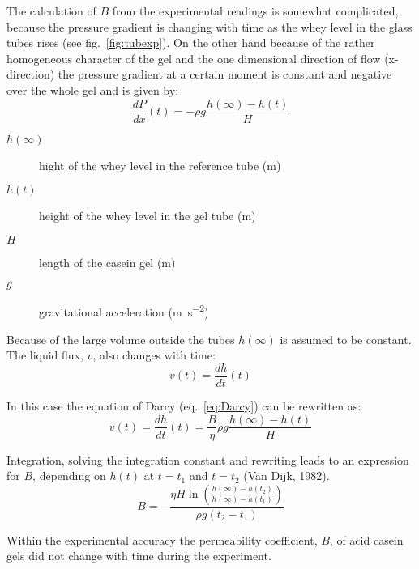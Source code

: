 \documentclass[12pt,a4paper]{article}
\begin{document}
The calculation of $B$ from the experimental readings is somewhat complicated, because the pressure gradient is changing with time as the whey level in the glass tubes rises (see fig.~\ref{fig:tubexp}). On the other hand because of the rather homogeneous character of the gel and the one dimensional direction of flow (x-direction) the pressure gradient at a certain moment is constant and negative over the whole gel and is given by:
\begin{equation}
\frac{dP}{dx}(t) = -\rho g\frac{h(\infty)-h(t)}{H}
\end{equation}
\begin{description}
\item[$h(\infty)$] hight of the whey level in the reference tube (\si{\metre})
\item[$h(t)$] height of the whey level in the gel tube (\si{\metre})
\item[$H$] length of the casein gel (\si{\metre})
\item[$g$] gravitational acceleration (\si{\metre\per\square\second})
\end{description}

Because of the large volume outside the tubes $h(\infty)$ is assumed to be constant. The liquid flux, $v$, also changes with time:
\begin{equation}
v(t) = \frac{dh}{dt}(t)
\end{equation}

In this case the equation of Darcy (eq.~\eqref{eq:Darcy}) can be rewritten as:
\begin{equation}
 v(t) = \frac{dh}{dt}(t) = \frac{B}{\eta}\rho g\frac{h(\infty)-h(t)}{H}
\end{equation}

Integration, solving the integration constant and rewriting leads to an expression for $B$, depending on $h(t)$ at $t=t_1$ and $t=t_2$ (Van Dijk, 1982).
\begin{equation}
B = -\frac{\eta H \ln\left(\frac{h(\infty)-h(t_2)}{h(\infty)-h(t_1)}\right)}{\rho g (t_2-t_1)}
\end{equation}

Within the experimental accuracy the permeability coefficient, $B$, of acid casein gels did not change with time during the experiment.
\end{document}
